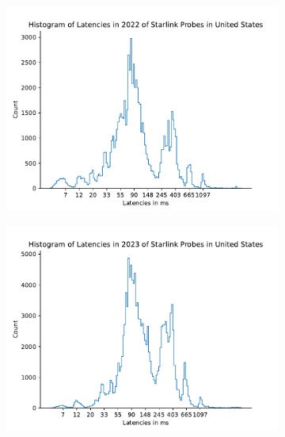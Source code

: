 \begin{figure}
	\centering
	\begin{subfigure}[b]{0.3\linewidth}
		\includegraphics[width=\linewidth]{chapters/4-results/latency/img/histogram_of_latencies_in_2022_of_starlink_probes_in_united_states.pdf}
	\end{subfigure}
	\begin{subfigure}[b]{0.3\linewidth}
		\includegraphics[width=\linewidth]{chapters/4-results/latency/img/histogram_of_latencies_in_2023_of_starlink_probes_in_united_states.pdf}
	\end{subfigure}
	\begin{subfigure}[b]{0.3\linewidth}

\end{subfigure}
\end{figure}
